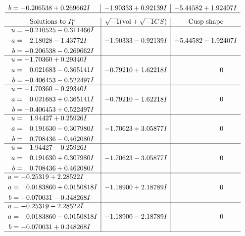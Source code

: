 \documentclass[1p]{elsarticle_modified}
\theoremstyle{definition}
\newcommand{\I}{\sqrt{-1}}
\begin{document}
$$\begin{array}{c|c|c}
\begin{aligned}
b &= -0.206538 + 0.269662 I\end{aligned}
 & -1.90333 + 0.92139 I & -5.44582 + 1.92407 I\\
 \hline 
 \end{array}$$\newpage$$\begin{array}{c|c|c}  
\text{Solutions to }I^u_{1}& \I (\text{vol} + \sqrt{-1}CS) & \text{Cusp shape}\\
 \hline 
\begin{aligned}
u &= -0.210525 - 0.311466 I \\
a &= \phantom{-}2.18028 - 1.43772 I \\
b &= -0.206538 - 0.269662 I\end{aligned}
 & -1.90333 - 0.92139 I & -5.44582 - 1.92407 I \\ \hline\begin{aligned}
u &= -1.70360 + 0.29340 I \\
a &= \phantom{-}0.021683 - 0.365141 I \\
b &= -0.406453 - 0.522497 I\end{aligned}
 & -0.79210 + 1.62218 I & \phantom{-0.000000 } 0 \\ \hline\begin{aligned}
u &= -1.70360 - 0.29340 I \\
a &= \phantom{-}0.021683 + 0.365141 I \\
b &= -0.406453 + 0.522497 I\end{aligned}
 & -0.79210 - 1.62218 I & \phantom{-0.000000 } 0 \\ \hline\begin{aligned}
u &= \phantom{-}1.94427 + 0.25926 I \\
a &= \phantom{-}0.191630 - 0.307980 I \\
b &= \phantom{-}0.708436 - 0.462080 I\end{aligned}
 & -1.70623 + 3.05877 I & \phantom{-0.000000 } 0 \\ \hline\begin{aligned}
u &= \phantom{-}1.94427 - 0.25926 I \\
a &= \phantom{-}0.191630 + 0.307980 I \\
b &= \phantom{-}0.708436 + 0.462080 I\end{aligned}
 & -1.70623 - 3.05877 I & \phantom{-0.000000 } 0 \\ \hline\begin{aligned}
u &= -0.25319 + 2.28522 I \\
a &= \phantom{-}0.0183860 + 0.0150818 I \\
b &= -0.070031 - 0.348268 I\end{aligned}
 & -1.18900 + 2.18789 I & \phantom{-0.000000 } 0 \\ \hline\begin{aligned}
u &= -0.25319 - 2.28522 I \\
a &= \phantom{-}0.0183860 - 0.0150818 I \\
b &= -0.070031 + 0.348268 I\end{aligned}
 & -1.18900 - 2.18789 I & \phantom{-0.000000 } 0\\
 \hline 
 \end{array}$$\newpage\newpage\renewcommand{\arraystretch}{1}
\end{document}
